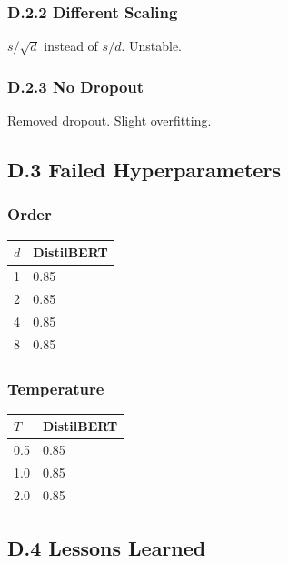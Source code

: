 \subsubsection{D.2.2 Different Scaling}

$s / \sqrt{d}$ instead of $s / d$. Unstable.

\subsubsection{D.2.3 No Dropout}

Removed dropout. Slight overfitting.

\subsection{D.3 Failed Hyperparameters}

\subsubsection{Order}

\begin{table}[H]
\centering
\small
\begin{tabular}{ll}
\toprule
\textbf{$d$} & \textbf{DistilBERT} \\
\midrule
1 & 0.85 \\
2 & 0.85 \\
4 & 0.85 \\
8 & 0.85 \\
\bottomrule
\end{tabular}
\end{table}

\subsubsection{Temperature}

\begin{table}[H]
\centering
\small
\begin{tabular}{ll}
\toprule
\textbf{$T$} & \textbf{DistilBERT} \\
\midrule
0.5 & 0.85 \\
1.0 & 0.85 \\
2.0 & 0.85 \\
\bottomrule
\end{tabular}
\end{table}

\subsection{D.4 Lessons Learned}

